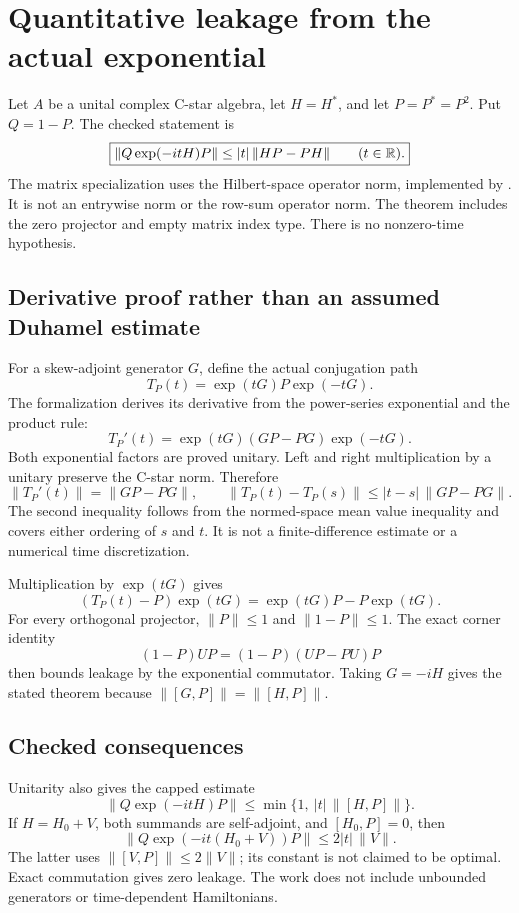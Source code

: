 \section{Quantitative leakage from the actual exponential}\label{supp4:section:001}
Let $A$ be a unital complex C-star algebra, let $H=H^*$, and let $P=P^*=P^2$. Put $Q=1-P$. The checked statement is
\[
\boxed{\|Q\exp(-itH)P\|\le |t|\,\|HP-PH\|\qquad(t\in\R).}
\]
The matrix specialization uses the Hilbert-space operator norm, implemented by . It is not an entrywise norm or the row-sum operator norm. The theorem includes the zero projector and empty matrix index type. There is no nonzero-time hypothesis.

\subsection{Derivative proof rather than an assumed Duhamel estimate}
For a skew-adjoint generator $G$, define the actual conjugation path
\[
T_P(t)=\exp(tG)P\exp(-tG).
\]
The formalization derives its derivative from the power-series exponential and the product rule:
\[
T_P'(t)=\exp(tG)(GP-PG)\exp(-tG).
\]
Both exponential factors are proved unitary. Left and right multiplication by a unitary preserve the C-star norm. Therefore
\[
\|T_P'(t)\|=\|GP-PG\|,
\qquad
\|T_P(t)-T_P(s)\|\le |t-s|\,\|GP-PG\|.
\]
The second inequality follows from the normed-space mean value inequality and covers either ordering of $s$ and $t$. It is not a finite-difference estimate or a numerical time discretization.

Multiplication by $\exp(tG)$ gives
\[
(T_P(t)-P)\exp(tG)=\exp(tG)P-P\exp(tG).
\]
For every orthogonal projector, $\|P\|\le1$ and $\|1-P\|\le1$. The exact corner identity
\[
(1-P)UP=(1-P)(UP-PU)P
\]
then bounds leakage by the exponential commutator. Taking $G=-iH$ gives the stated theorem because $\|[G,P]\|=\|[H,P]\|$.

\subsection{Checked consequences}
Unitarity also gives the capped estimate
\[
\|Q\exp(-itH)P\|\le\min\{1,\ |t|\,\|[H,P]\|\}.
\]
If $H=H_0+V$, both summands are self-adjoint, and $[H_0,P]=0$, then
\[
\|Q\exp(-it(H_0+V))P\|\le2|t|\,\|V\|.
\]
The latter uses $\|[V,P]\|\le2\|V\|$; its constant is not claimed to be optimal. Exact commutation gives zero leakage. The work does not include unbounded generators or time-dependent Hamiltonians.




